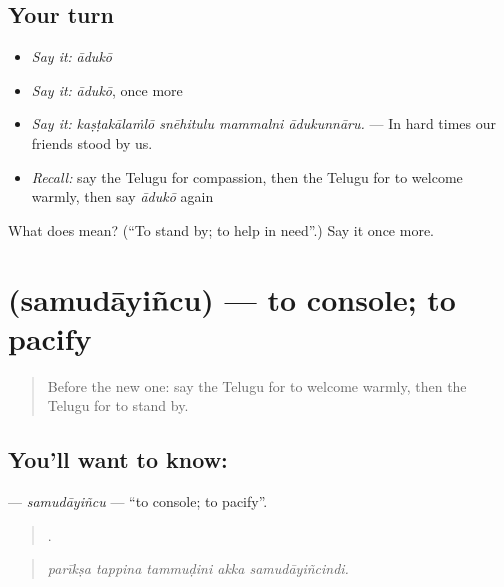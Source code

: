 \subsection*{Your turn}
\begin{itemize}
\raggedright
  \item \emph{Say it:} \emph{ādukō}
  \item \emph{Say it:} \emph{ādukō}, once more
  \item \emph{Say it:} \emph{kaṣṭakālaṁlō snēhitulu mammalni ādukunnāru.} — In hard times our friends stood by us.
  \item \emph{Recall:} say the Telugu for compassion, then the Telugu for to welcome warmly, then say \emph{ādukō} again
\end{itemize}

\begin{tcolorbox}[breakable,colback=teal!4,colframe=teal!35!black,title={Before you move on}]
What does  mean? (\textquotedblleft{}To stand by; to help in need\textquotedblright{}.) Say it once more.
\end{tcolorbox}
\section[\texorpdfstring{\te{సముదాయించు} (samudāyiñcu)}{సముదాయించు (samudāyiñcu)}]{ (samudāyiñcu) — to console; to pacify}

\label{lesson:TE-C505-samudayincu}



\begin{quote}
Before the new one: say the Telugu for to welcome warmly, then the Telugu for to stand by.
\end{quote}

\subsection*{You'll want to know: }
\textbf{} — \emph{samudāyiñcu} — \textquotedblleft{}to console; to pacify\textquotedblright{}.

\begin{quote}
    .
\end{quote}

\begin{quote}
\emph{parīkṣa tappina tammuḍini akka samudāyiñcindi.}
\end{quote}

